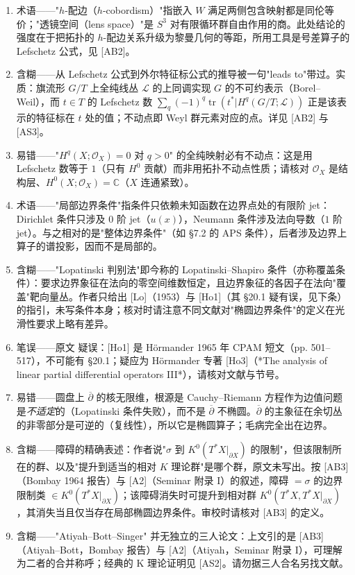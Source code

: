 \documentclass[11pt]{amsart}
\theoremstyle{definition}
\theoremstyle{remark}
\theoremstyle{plain}
\numberwithin{equation}{section}
\renewcommand{\:}{\colon}
\newcommand{\CC}{{\mathbb C}}
\DeclareMathOperator{\tr}{tr}
\newcommand{\dbar}{{\overline\partial}}
\newcommand{\sO}{\mathcal{O}}
\begin{document}
\begin{enumerate}[leftmargin=2.2em,itemsep=2pt,topsep=2pt]
  \item 术语——"$h$-配边（$h$-cobordism）"指嵌入 $W$ 满足两侧包含映射都是同伦等价；"透镜空间（lens space）"是 $S^3$ 对有限循环群自由作用的商。此处结论的强度在于把拓扑的 $h$-配边关系升级为黎曼几何的等距，所用工具是号差算子的 Lefschetz 公式，见 [AB2]。
  \item 含糊——从 Lefschetz 公式到外尔特征标公式的推导被一句"leads to"带过。实质：旗流形 $G/T$ 上全纯线丛 $\mathscr{L}$ 的上同调实现 $G$ 的不可约表示（Borel–Weil），而 $t\in T$ 的 Lefschetz 数 $\sum_q(-1)^q\tr(t^*|H^q(G/T;\mathscr{L}))$ 正是该表示的特征标在 $t$ 处的值；不动点即 Weyl 群元素对应的点。详见 [AB2] 与 [AS3]。
  \item 易错——"$H^q(X;\sO_X)=0$ 对 $q>0$" 的全纯映射必有不动点：这是用 Lefschetz 数等于 $1$（只有 $H^0$ 贡献）而非用拓扑不动点性质；请核对 $\sO_X$ 是结构层、$H^0(X;\sO_X)=\CC$（$X$ 连通紧致）。
  \item 术语——"局部边界条件"指条件只依赖未知函数在边界点处的有限阶 jet：Dirichlet 条件只涉及 $0$ 阶 jet（$u(x)$），Neumann 条件涉及法向导数（$1$ 阶 jet）。与之相对的是"整体边界条件"（如 §7.2 的 APS 条件），后者涉及边界上算子的谱投影，因而不是局部的。
  \item 含糊——"Lopatinski 判别法"即今称的 Lopatinski–Shapiro 条件（亦称覆盖条件）：要求边界象征在法向的零空间维数恒定，且边界象征的各因子在法向"覆盖"靶向量丛。作者只给出 [Lo]（1953）与 [Ho1]（其 §20.1 疑有误，见下条）的指引，未写条件本身；核对时请注意不同文献对"椭圆边界条件"的定义在光滑性要求上略有差异。
  \item 笔误——原文 \cite[\S20.1]{Ho1} 疑误：[Ho1] 是 Hörmander 1965 年 CPAM 短文（pp. 501–517），不可能有 §20.1；疑应为 Hörmander 专著 [Ho3]（*The analysis of linear partial differential operators III*），请核对文献与节号。
  \item 易错——圆盘上 $\dbar$ 的核无限维，根源是 Cauchy–Riemann 方程作为边值问题是\emph{不适定}的（Lopatinski 条件失败），而不是 $\dbar$ 不椭圆。$\dbar$ 的主象征在余切丛的非零部分是可逆的（复线性），所以它是椭圆算子；毛病完全出在边界。
  \item 含糊——障碍的精确表述：作者说"$\sigma$ 到 $K^0(T^*X|_{\partial X})$ 的限制"，但该限制所在的群、以及"提升到适当的相对 $K$ 理论群"是哪个群，原文未写出。按 [AB3]（Bombay 1964 报告）与 [A2]（Seminar 附录 I）的叙述，障碍 $=\sigma$ 的边界限制类 $\in K^0(T^*X|_{\partial X})$；该障碍消失时可提升到相对群 $K^0(T^*X,T^*X|_{\partial X})$，其消失当且仅当存在局部椭圆边界条件。审校时请核对 [AB3] 的定义。
  \item 含糊——"Atiyah–Bott–Singer" 并无独立的三人论文：上文引的是 [AB3]（Atiyah–Bott，Bombay 报告）与 [A2]（Atiyah，Seminar 附录 I），可理解为二者的合并称呼；经典的 K 理论证明见 [AS2]。请勿据三人合名另找文献。

\end{enumerate}
\end{document}
